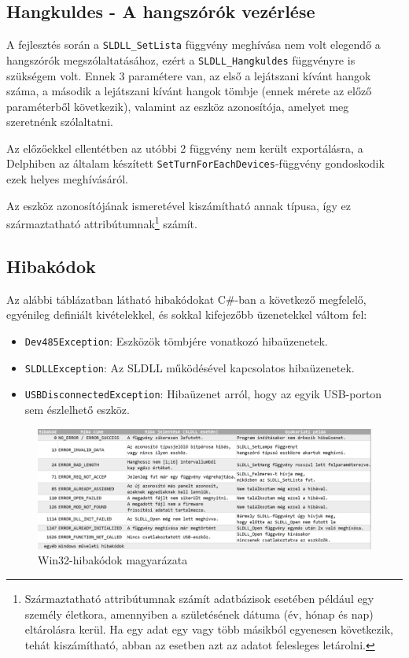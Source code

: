 \documentclass[tocnopagenum]{thesis-ekf}
\begin{document}
	\subsection{Hangkuldes - A hangszórók vezérlése}
	A fejlesztés során a \verb*|SLDLL_SetLista| függvény meghívása nem volt elegendő a hangszórók megszólaltatásához, ezért a \verb*|SLDLL_Hangkuldes| függvényre is szükségem volt. Ennek 3 paramétere van, az első a lejátszani kívánt hangok száma, a második a lejátszani kívánt hangok tömbje (ennek mérete az előző paraméterből következik), valamint az eszköz azonosítója, amelyet meg szeretnénk szólaltatni.
	
	Az előzőekkel ellentétben az utóbbi 2 függvény nem került exportálásra, a Delphiben az általam készített \verb*|SetTurnForEachDevices|-függvény gondoskodik ezek helyes meghívásáról.
	
	Az eszköz azonosítójának ismeretével kiszámítható annak típusa, így ez származtatható attribútumnak\footnote{Származtatható attribútumnak számít adatbázisok esetében például egy személy életkora, amennyiben a születésének dátuma (év, hónap és nap) eltárolásra kerül. Ha egy adat egy vagy több másikból egyenesen következik, tehát kiszámítható, abban az esetben azt az adatot felesleges letárolni.} számít.
	\subsection{Hibakódok}
	Az alábbi táblázatban látható hibakódokat C\#-ban a következő megfelelő, egyénileg definiált kivételekkel, és sokkal kifejezőbb üzenetekkel váltom fel:
	\begin{itemize}
		\item \verb*|Dev485Exception|: Eszközök tömbjére vonatkozó hibaüzenetek.
		\item \verb*|SLDLLException|: Az SLDLL működésével kapcsolatos hibaüzenetek.
		\item \verb*|USBDisconnectedException|: Hibaüzenet arról, hogy az egyik USB-porton sem észlelhető eszköz.
	\end{itemize}

	\begin{figure}[H]
		\centering
		\hspace*{-0.5in}
		\includegraphics[scale=0.5]{images/errcodes.png}
		\caption[Hibakódok és magyarázataik]{Win32-hibakódok magyarázata}
		\label{fig:errcodes}
	\end{figure}
\end{document}
